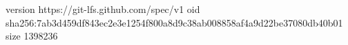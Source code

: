 version https://git-lfs.github.com/spec/v1
oid sha256:7ab3d459df843ec2e3e1254f800a8d9c38ab008858af4a9d22be37080db40b01
size 1398236

